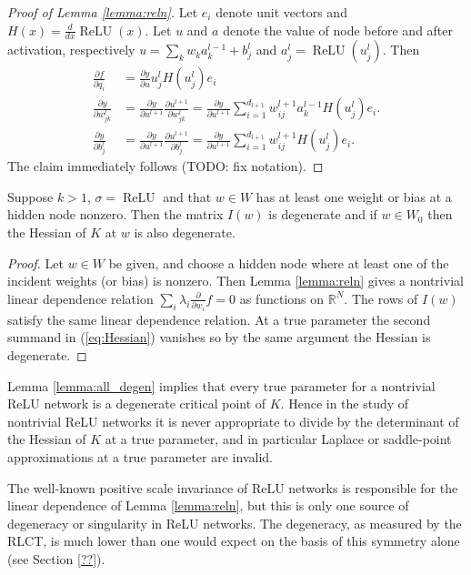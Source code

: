 \documentclass{article} %
\begin{document}
\begin{proof}[Proof of Lemma \ref{lemma:reln}]
	Let $e_i$ denote unit vectors and $H(x)=\frac{d}{dx}\operatorname{ReLU}(x)$. Let $u$ and $a$ denote the value of node before and after activation, respectively $u =\sum_k w_k a_{k}^{l-1}+b_{j}^{l}$ and $a_{j}^{l} =\operatorname{ReLU}(u_{j}^{l})$. Then
	\begin{align*}
	\frac{\partial f}{\partial q_i}&=\frac{\partial y}{\partial u}u_{j}^{l}H(u_{j}^{l})e_{i}\\
	\frac{\partial y}{\partial w_{jk}^{l}}&=\frac{\partial y}{\partial u^{l+1}}\frac{\partial u^{l+1}}{\partial w_{jk}^{l}}=\frac{\partial y}{\partial u^{l+1}}\sum_{i=1}^{d_{l+1}}w_{ij}^{l+1}a_{k}^{l-1}H(u_{j}^{l})e_{i}.\\
	\frac{\partial y}{\partial b_{j}^{l}}&=\frac{\partial y}{\partial u^{l+1}}\frac{\partial u^{l+1}}{\partial b_{j}^{l}}=\frac{\partial y}{\partial u^{l+1}}\sum_{i=1}^{d_{l+1}}w_{ij}^{l+1}H(u_{j}^{l})e_{i}.
	\end{align*}
	The claim immediately follows (TODO: fix notation).
\end{proof}

\begin{lemma}\label{lemma:all_degen} Suppose $k > 1$, $\sigma = \operatorname{ReLU}$ and that $w \in W$ has at least one weight or bias at a hidden node nonzero. Then the matrix $I(w)$ is degenerate and if $w \in W_0$ then the Hessian of $K$ at $w$ is also degenerate.
\end{lemma}
\begin{proof}
	Let $w \in W$ be given, and choose a hidden node where at least one of the incident weights (or bias) is nonzero. Then Lemma \ref{lemma:reln} gives a nontrivial linear dependence relation $\sum_i \lambda_i \frac{\partial}{\partial w_i} f = 0$ as functions on $\mathbb{R}^N$. The rows of $I(w)$ satisfy the same linear dependence relation. At a true parameter the second summand in (\ref{eq:Hessian}) vanishes so by the same argument the Hessian is degenerate.
\end{proof}

Lemma \ref{lemma:all_degen} implies that every true parameter for a nontrivial ReLU network is a degenerate critical point of $K$. Hence in the study of nontrivial ReLU networks it is never appropriate to divide by the determinant of the Hessian of $K$ at a true parameter, and in particular Laplace or saddle-point approximations at a true parameter are invalid.

The well-known positive scale invariance of ReLU networks is responsible for the linear dependence of Lemma \ref{lemma:reln}, but this is only one source of degeneracy or singularity in ReLU networks. The degeneracy, as measured by the RLCT, is much lower than one would expect on the basis of this symmetry alone (see Section \ref{??}).
\end{document}

